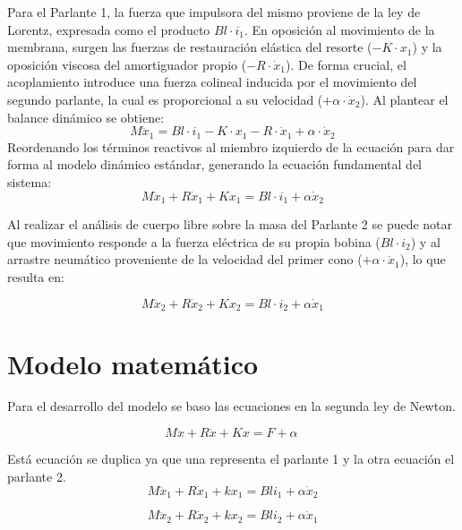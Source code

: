 \documentclass[journal]{IEEEtran}
\begin{document}
Para el Parlante 1, la fuerza que impulsora del mismo proviene de la ley de Lorentz, expresada como el producto $Bl \cdot i_1$. En oposición al movimiento de la membrana, surgen las fuerzas de restauración elástica del resorte ($-K \cdot x_1$) y la oposición viscosa del amortiguador propio ($-R \cdot \dot{x}_1$). De forma crucial, el acoplamiento introduce una fuerza colineal inducida por el movimiento del segundo parlante, la cual es proporcional a su velocidad ($+\alpha \cdot \dot{x}_2$). Al plantear el balance dinámico se obtiene:
\begin{equation}
    M \ddot{x}_1 = Bl \cdot i_1 - K \cdot x_1 - R \cdot \dot{x}_1 + \alpha \cdot \dot{x}_2
\end{equation}
Reordenando los términos reactivos al miembro izquierdo de la ecuación para dar forma al modelo dinámico estándar, generando la ecuación fundamental del sistema:
\begin{equation}
    M \ddot{x}_1 + R \dot{x}_1 + K x_1 = Bl \cdot i_1 + \alpha \dot{x}_2
\end{equation}

Al realizar el análisis de cuerpo libre sobre la masa del Parlante 2 se puede notar que movimiento responde a la fuerza eléctrica de su propia bobina ($Bl \cdot i_2$) y al arrastre neumático proveniente de la velocidad del primer cono ($+\alpha \cdot \dot{x}_1$), lo que resulta en:

\begin{equation}
    M \ddot{x}_2 + R \dot{x}_2 + K x_2 = Bl \cdot i_2 + \alpha \dot{x}_1
\end{equation}

\section{Modelo matemático}
Para el desarrollo del modelo se baso las ecuaciones en la segunda ley de Newton.

\begin{equation}
M\ddot{x} + R\dot{x} + Kx = F + \alpha\ 
\end{equation}

Está ecuación se duplica ya que una representa el parlante 1 y la otra ecuación el parlante 2. 
\begin{equation}
    M\ddot{x}_1 + R\dot{x}_1 + kx_1 = Bl i_1 + \alpha \dot{x}_2
\end{equation}

\begin{equation}
    M\ddot{x}_2 + R\dot{x}_2 + kx_2 = Bl i_2 + \alpha \dot{x}_1
\end{equation}
\end{document}
